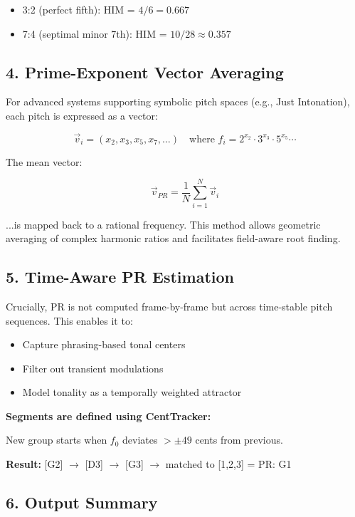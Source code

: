 \documentclass{article}
\begin{document}
\begin{itemize}
    \item 3:2 (perfect fifth): HIM = $4/6 = 0.667$
    \item 7:4 (septimal minor 7th): HIM = $10/28 \approx 0.357$
\end{itemize}

\subsection*{4. Prime-Exponent Vector Averaging}

For advanced systems supporting symbolic pitch spaces (e.g., Just Intonation), each pitch is expressed as a vector:

\[
\vec{v}_i = (x_2, x_3, x_5, x_7, \ldots) \quad \text{where } f_i = 2^{x_2} \cdot 3^{x_3} \cdot 5^{x_5} \cdots
\]

The mean vector:

\[
\vec{v}_{PR} = \frac{1}{N} \sum_{i=1}^N \vec{v}_i
\]

...is mapped back to a rational frequency. This method allows geometric averaging of complex harmonic ratios and facilitates field-aware root finding.

\subsection*{5. Time-Aware PR Estimation}

Crucially, PR is not computed frame-by-frame but across time-stable pitch sequences. This enables it to:

\begin{itemize}
    \item Capture phrasing-based tonal centers
    \item Filter out transient modulations
    \item Model tonality as a temporally weighted attractor
\end{itemize}

\textbf{Segments are defined using CentTracker:}

New group starts when $f_0$ deviates $> \pm49$ cents from previous.

\textbf{Result:} [G2] $\rightarrow$ [D3] $\rightarrow$ [G3] $\rightarrow$ matched to [1,2,3] = PR: G1

\subsection*{6. Output Summary}
\end{document}
